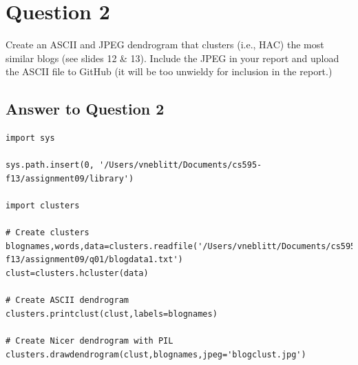 \documentclass{article}
\begin{document}
\newpage
\section*{Question 2}
Create an ASCII and JPEG dendrogram that clusters (i.e., HAC) the most similar blogs (see slides 12 \& 13). Include the JPEG in your report and upload the ASCII file to GitHub (it will be too unwieldy for inclusion in the report.)

\subsection*{Answer to Question 2}

\begin{lstlisting}[frame=single, caption=generateImages.py, label=generateImages]
import sys

sys.path.insert(0, '/Users/vneblitt/Documents/cs595-f13/assignment09/library')

import clusters

# Create clusters
blognames,words,data=clusters.readfile('/Users/vneblitt/Documents/cs595-f13/assignment09/q01/blogdata1.txt')
clust=clusters.hcluster(data)

# Create ASCII dendrogram
clusters.printclust(clust,labels=blognames)

# Create Nicer dendrogram with PIL
clusters.drawdendrogram(clust,blognames,jpeg='blogclust.jpg')
\end{lstlisting}
\end{document}
